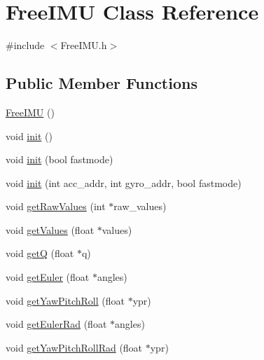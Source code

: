 \hypertarget{classFreeIMU}{\section{Free\-I\-M\-U Class Reference}
\label{classFreeIMU}
}


{\ttfamily \#include $<$Free\-I\-M\-U.\-h$>$}

\subsection*{Public Member Functions}
\begin{DoxyCompactItemize}
\item 
\hyperlink{classFreeIMU_a185003bc29552ca92d26818974ecdd44}{Free\-I\-M\-U} ()
\item 
void \hyperlink{classFreeIMU_ad1e754f18d487fe4a96a1b06785f48e6}{init} ()
\item 
void \hyperlink{classFreeIMU_ae425675f021e7b51fd6b585b5a1d45c1}{init} (bool fastmode)
\item 
void \hyperlink{classFreeIMU_a2c01b69cc66a7cee2a173c40ffb498dc}{init} (int acc\-\_\-addr, int gyro\-\_\-addr, bool fastmode)
\item 
void \hyperlink{classFreeIMU_aabe8509df00112add146cd4586052357}{get\-Raw\-Values} (int $\ast$raw\-\_\-values)
\item 
void \hyperlink{classFreeIMU_a0e907d7b71daac30eae359a9862a82cc}{get\-Values} (float $\ast$values)
\item 
void \hyperlink{classFreeIMU_a9e6c9c29fd3218c48ae5085fcab85d28}{get\-Q} (float $\ast$q)
\item 
void \hyperlink{classFreeIMU_adb4f824c9dcc816e9480e6f9b9e2b4d5}{get\-Euler} (float $\ast$angles)
\item 
void \hyperlink{classFreeIMU_acf0833c0ad1367de460dcbbe434468ff}{get\-Yaw\-Pitch\-Roll} (float $\ast$ypr)
\item 
void \hyperlink{classFreeIMU_ad983cd9107481f382600dcbc64c063b6}{get\-Euler\-Rad} (float $\ast$angles)
\item 
void \hyperlink{classFreeIMU_afba87b9bd2b20628ea920bbab319bfc3}{get\-Yaw\-Pitch\-Roll\-Rad} (float $\ast$ypr)
\end{DoxyCompactItemize}
